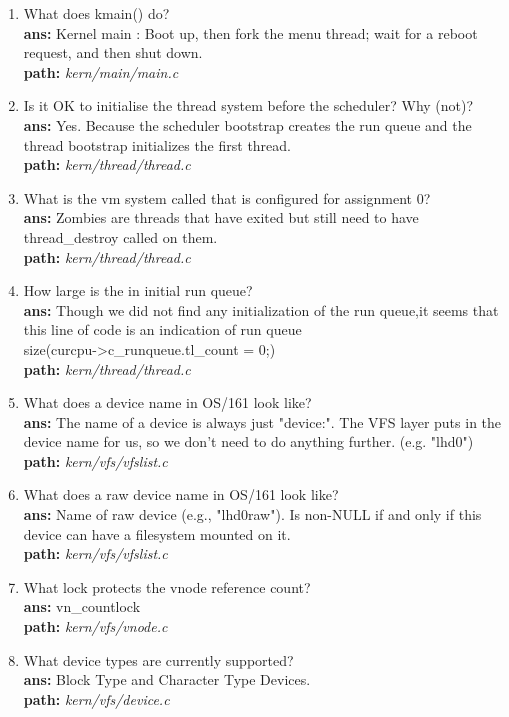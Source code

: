 \documentclass[14pt, a4paper]{article}
\begin{document}
\begin{enumerate}
    \item What does kmain() do?\\
          \textbf{ans: } Kernel main : Boot up, then fork the menu thread; wait for a reboot request, and then shut down.\\
          \textbf{path:} \emph{kern/main/main.c}
    \item Is it OK to initialise the thread system before the scheduler? Why (not)?\\
          \textbf{ans: } Yes. Because the scheduler bootstrap creates the run queue and the thread bootstrap initializes the first thread.\\
          \textbf{path:} \emph{kern/thread/thread.c}
    \item What is the vm system called that is configured for assignment 0?\\
          \textbf{ans: } Zombies are threads that have exited but still need to have thread\_destroy called on them.\\
          \textbf{path:} \emph{kern/thread/thread.c}
    \item  How large is the in initial run queue?\\
          \textbf{ans: } Though we did not find any initialization of the run queue,it seems that this line of code is an indication of run queue\\ size(curcpu->c\_runqueue.tl\_count = 0;)\\
          \textbf{path:} \emph{kern/thread/thread.c}
    \item What does a device name in OS/161 look like?\\
          \textbf{ans: } The name of a device is always just "device:". The VFS layer puts in the device name for us, so we don’t need to do anything further. (e.g. "lhd0")\\
          \textbf{path:} \emph{kern/vfs/vfslist.c}
    \item What does a raw device name in OS/161 look like?\\
          \textbf{ans: } Name of raw device (e.g., "lhd0raw"). Is non-NULL if and only if this device can have a filesystem mounted on it.\\
          \textbf{path:} \emph{kern/vfs/vfslist.c}
    \item What lock protects the vnode reference count?\\
          \textbf{ans: } vn\_countlock\\
          \textbf{path:} \emph{kern/vfs/vnode.c}\\
    \item What device types are currently supported?\\
          \textbf{ans: } Block Type and Character Type Devices.\\
          \textbf{path:} \emph{kern/vfs/device.c}
\end{enumerate}
\end{document}
